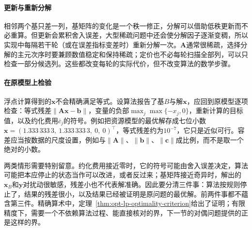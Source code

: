 \paragraph{更新与重新分解}
相邻两个基只差一列，基矩阵的变化是一个秩一修正，分解可以借助低秩更新而不必重算。但更新会累积舍入误差，大型稀疏问题中还会使分解因子逐渐变稠，所以实现中每隔若干轮（或在误差指标变差时）重新分解一次。$\bm A$通常很稀疏，选择分解的主元次序时要兼顾数值稳定和保持稀疏；定价也不必每轮扫描全部列，可以只检查一部分候选列。这些都改变每轮的实际代价，但不改变算法的数学步骤。

\paragraph{在原模型上检验}
浮点计算得到的$\bm x$不会精确满足等式。设算法报告了基$B$与解$\bm x$，应回到原模型逐项检查：等式残差$\lVert\bm A\bm x-\bm b\rVert$，变量的负部$\max_j\max\{-x_j,0\}$，重新计算的目标值，以及约化费用$\bar c_j$的符号。例如把资源模型的最优解存成七位小数$\bm x=(1.333\,333\,3,\ 1.333\,333\,3,\ 0,\ 0)^\top$，等式残差约为$10^{-7}$，它只是近似可行。容差应当按数据的尺度设置，例如与$\lVert\bm A\rVert$、$\lVert\bm b\rVert$、$\lVert\bm c\rVert$成比例，而不是取一个绝对的小数。

两类情形需要特别留意。约化费用接近零时，它的符号可能由舍入误差决定，算法可能把本应停止的状态当作可以改进，或者反过来；基矩阵接近奇异时，解出的$\bm x_B$和$\bm y$对扰动很敏感，残差小也不代表解准确。因此要分清三件事：算法按规则停止了，结果的残差很小，以及结果已经被证明是原问题的最优解。前两件事都不蕴含第三件。精确算术中，定理~\ref{thm:opt-lp-optimality-criterion}给出了证明；有限精度下，需要一个不依赖算法过程、能直接核对的界，下一节的对偶问题提供的正是这样的界。
